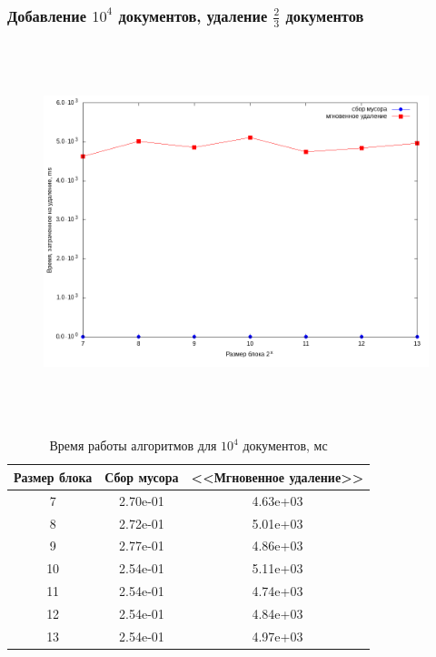 \subsubsection{Добавление $10^4$ документов, удаление $\frac{2}{3}$ документов}
\begin{figure}[H]
\includegraphics[width=\linewidth, height=11cm]{fig/time_1e4.png}
\end{figure}

\begin{table}[H]
      \caption{Время работы алгоритмов для $10^4$ документов, мс}
      \centering
      \small
      \singlespacing
      \begin{tabular}{|c|c|c|}
            \hline
            Размер блока & Сбор мусора                & <<Мгновенное удаление>> \\ \hline \hline
            7            & 2.70e-01	                  & 4.63e+03              \\ \hline
            8            & 2.72e-01	                  & 5.01e+03              \\ \hline
            9            & 2.77e-01	                  & 4.86e+03              \\ \hline
            10           & 2.54e-01                   & 5.11e+03              \\ \hline
            11           & 2.54e-01                   & 4.74e+03              \\ \hline
            12           & 2.54e-01	                  & 4.84e+03              \\ \hline
            13           & 2.54e-01	                  & 4.97e+03              \\ \hline
\end{tabular}
\end{table}

